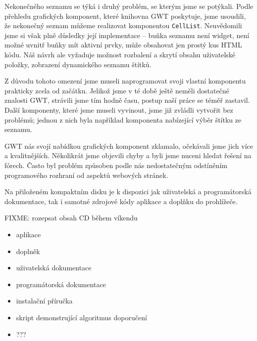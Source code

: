 
Nekonečného seznamu se týká i druhý problém, se kterým jsme se potýkali.
Podle přehledu grafických komponent, které knihovna GWT poskytuje, jsme usoudili, že nekonečný seznam můžeme realizovat komponentou \verb|CellList|.
Neuvědomili jsme si však plně důsledky její implementace -- buňka seznamu není widget, není možné uvnitř buňky mít aktivní prvky, může obsahovat jen prostý kus HTML kódu.
Náš návrh ale vyžaduje možnost rozbalení a skrytí obsahu uživatelské položky, zobrazení dynamického seznamu štítků.

Z důvodu tohoto omezení jsme museli naprogramovat svoji vlastní komponentu prakticky zcela od začátku.
Jelikož jsme v té době ještě neměli dostatečné znalosti GWT, strávili jsme tím hodně času, postup naší práce se téměř zastavil.
Další komponenty, které jsme museli vyvinout, jsme již zvládli vytvořit bez problémů; jednou z nich byla například komponenta nabízející výběr štítku ze seznamu.

GWT nás svojí nabídkou grafických komponent zklamalo, očekávali jsme jich více a kvalitnějších.
Několikrát jsme objevili chyby a byli jsme nuceni hledat řešení na fórech.
Často byl problém způsoben podle nás nedostatečným odstíněním programového rozhraní od aspektů webových stránek.


Na přiloženém kompaktním disku je k dispozici jak uživatelská a programátorská dokumentace, tak i samotné zdrojové kódy aplikace a doplňku do prohlížeče.

FIXME: rozepsat obsah CD během víkendu

\begin{itemize}
	\item aplikace
	\item doplněk
	\item uživatelská dokumentace
	\item programátorská dokumentace
	\item instalační příručka
	\item skript demonstrující algoritmus doporučení
	\item ???
\end{itemize}
